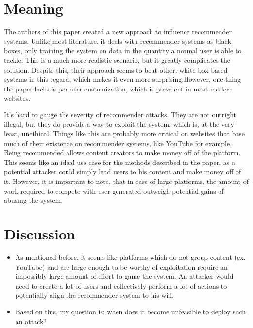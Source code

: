 \documentclass{article}
\begin{document}
\section{Meaning}

The authors of this paper created a new approach to influence recommender systems. Unlike most literature, it deals with recommender systems as black boxes, only training the system on data in the quantity a normal user is able to tackle. This is a much more realistic scenario, but it greatly complicates the solution. Despite this, their approach seems to beat other, white-box based systems in this regard, which makes it even more surprising.However, one thing the paper lacks is per-user customization, which is prevalent in most modern websites.

It's hard to gauge the severity of recommender attacks. They are not outright illegal, but they do provide a way to exploit the system, which is, at the very least, unethical. Things like this are probably more critical on websites that base much of their existence on recommender systems, like YouTube for example. Being recommended allows content creators to make money off of the platform. This seems like an ideal use case for the methods described in the paper, as a potential attacker could simply lead users to his content and make money off of it. However, it is important to note, that in case of large platforms, the amount of work required to compete with user-generated outweigh potential gains of abusing the system.

\section{Discussion}

\begin{itemize}
	\item As mentioned before, it seems like platforms which do not group content (ex. YouTube) and are large enough to be worthy of exploitation require an impossibly large amount of effort to game the system. An attacker would need to create a lot of users and collectively perform a lot of actions to potentially align the recommender system to his will.

	\item Based on this, my question is: when does it become unfeasible to deploy such an attack?
\end{itemize}
\end{document}
